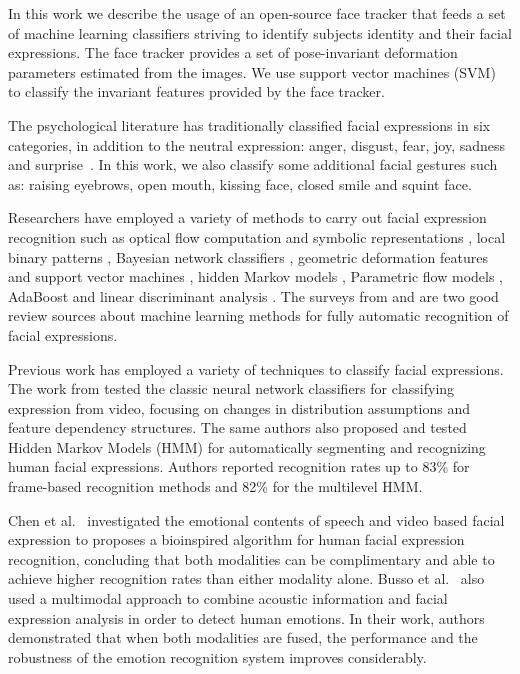 \documentclass[]{article}
\begin{document}
In this work we describe the usage of an open-source face tracker that feeds a set of machine learning classifiers
striving to identify subjects identity and their facial expressions. The face tracker provides a set of pose-invariant
deformation parameters estimated from the images. We use support vector machines (SVM) to classify the invariant
features provided by the face tracker.


The psychological literature has traditionally classified facial expressions in six categories, in addition to the
neutral expression: anger, disgust, fear, joy, sadness and
surprise~\cite{schmidt2002human}. In this work, we also classify some additional facial gestures such as: raising eyebrows, open mouth, kissing face, closed smile and squint face.


Researchers have employed a variety of methods to carry out facial expression recognition such as optical flow
computation  and symbolic representations \cite{Yacoob506414}, local binary patterns \cite{Shan2009803},  Bayesian
network classifiers \cite{Cohen1211408}, geometric deformation features and support vector machines
\cite{kotsia4032815}, hidden Markov models \cite{aleksic1597130, Cohen2003160}, Parametric flow models
\cite{blackAndYacoob}, AdaBoost and linear discriminant analysis \cite{bartlett1398364}. The surveys from
\cite{bartlett1398364} and \cite{Fasel2003259} are two good review sources about machine learning methods 
for fully automatic recognition of facial expressions. 


Previous work has employed a variety of techniques to classify  facial expressions. The work from \cite{Cohen2003160}
tested the classic neural network classifiers for classifying expression from video, focusing on changes in distribution
assumptions and feature dependency structures. The same authors also proposed and tested Hidden Markov Models (HMM) for
automatically segmenting and recognizing human facial expressions. Authors reported recognition rates up to 83\% for
frame-based recognition methods and 82\% for the multilevel HMM.


Chen et al.~\cite{Chen670976} investigated the emotional contents of speech and video based facial expression to
proposes a bioinspired algorithm for human facial expression recognition, concluding that both modalities can be
complimentary and able to achieve higher recognition rates than either modality alone. Busso et al.~\cite{Busso:2004} also
used a multimodal approach to combine acoustic information and facial expression analysis in order to detect human
emotions. In their work, authors demonstrated that when both modalities are fused, the performance and the robustness of
the emotion recognition system improves considerably.
\end{document}
